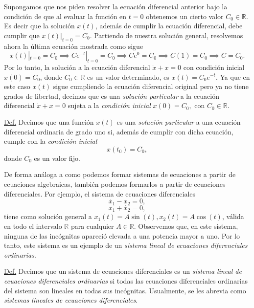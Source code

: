 \documentclass[12pt,libertine]{book}
\begin{document}
\vspace{3mm}
Supongamos que nos piden resolver la ecuación diferencial anterior bajo la condición de que al evaluar la función en $t=0$ obtenemos un cierto valor $C_0\in\mathbb{R}$. Es decir que la solución $x(t)$, además de cumplir la ecuación diferencial, debe cumplir que $x(t)|_{t=0}=C_0.$ Partiendo de nuestra solución general, resolvemos ahora la última ecuación mostrada como sigue $$x(t)|_{t=0}=C_0\implies C e^{-t}|_{t=0}=C_0\implies C e^{0}=C_0\implies C(1)=C_0\implies C=C_0.$$ Por lo tanto, la solución a la ecuación diferencial $\dot{x}+x=0$ con condición inicial $x(0)=C_0$, donde $C_0\in\mathbb{R}$ es un valor determinado, es $x(t)=C_0 e^{-t}$. Ya que en este caso $x(t)$ sigue cumpliendo la ecuación diferencial original pero ya no tiene grados de libertad, decimos que es una \emph{solución particular} a la ecuación diferencial $\dot{x}+x=0$ sujeta a la \emph{condición inicial} $x(0)=C_0,$ con $C_0\in\mathbb{R}$.

\vspace{3mm}
\begin{tcolorbox}
\underline{Def.} Decimos que una función $x(t)$ es una \emph{solución particular} a una ecuación diferencial ordinaria de grado uno si, además de cumplir con dicha ecuación, cumple con la \emph{condición inicial} $$x(t_0)=C_0,$$ donde $C_0$ es un valor fijo.
\end{tcolorbox}

De forma análoga a como podemos formar sistemas de ecuaciones a partir de ecuaciones algebraicas, también podemos formarlos a partir de ecuaciones diferenciales. Por ejemplo, el sistema de ecuaciones diferenciales $$\dot{x_1} - x_2 = 0,$$ $$x_1 + \dot{x_2} = 0,$$ tiene como solución general a $x_1(t)=A\sin(t), x_2(t)=A\cos(t)$, válida en todo el intervalo $\mathbb{R}$ para cualquier $A\in\mathbb{R}$. Observemos que, en este sistema, ninguna de las incógnitas apareció elevada a una potencia mayor a uno. Por lo tanto, este sistema es un ejemplo de un \emph{sistema lineal de ecuaciones diferenciales ordinarias}.

\vspace{3mm}
\begin{tcolorbox}
\underline{Def.} Decimos que un sistema de ecuaciones diferenciales es un \emph{sistema lineal de ecuaciones diferenciales ordinarias} si todas las ecuaciones diferenciales ordinarias del sistema son lineales en todas sus incógnitas. Usualmente, se les abrevia como \emph{sistemas lineales de ecuaciones diferenciales}.
\end{tcolorbox}
\vspace{3mm}
\end{document}
